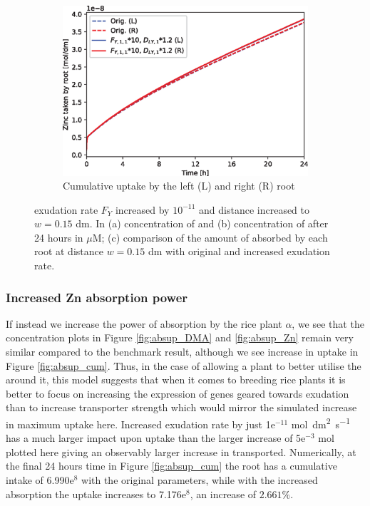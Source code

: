 \documentclass[11pt]{article}
\numberwithin{equation}{section}
\begin{document}
\begin{figure}[h]
\begin{subfigure}[t]{0.31\textwidth}
     \caption{}
     \label{fig:Fwup_Zn}
     \end{subfigure}
    \begin{subfigure}[t]{0.37\textwidth}
    \includegraphics[width=\textwidth]{Figures/testpics/ZnCumulative/IncreasedDistanceandDMAZnCumu.eps}
    \caption{Cumulative  uptake by the left (L) and right (R) root}
     \label{fig:Fwup_cum}
    \end{subfigure}
    \caption{ exudation rate $F_Y$ increased by $10^{-11}$ and distance increased to $w=0.15$ \si{dm}. In (a) concentration of  and (b) concentration of  after 24 hours in $\mu$M; (c) comparison of the amount of  absorbed by each root at distance $w=0.15$ \si{dm} with original and increased exudation rate.}
\end{figure}

 
 \subsubsection{Increased Zn absorption power}
 
If instead we increase the power of  absorption by the rice plant $\alpha$, we see that the concentration plots in Figure \ref{fig:absup_DMA} and \ref{fig:absup_Zn} remain very similar compared to the benchmark result, although we see increase in  uptake in Figure \ref{fig:absup_cum}. Thus, in the case of allowing a plant to better utilise the  around it, this model suggests that when it comes to breeding rice plants it is better to focus on increasing the expression of genes geared towards  exudation than to increase transporter strength which would mirror the simulated increase in maximum  uptake here. Increased  exudation rate by just 1e$^{-11}$ \si{mol.dm^2.s^{-1}}  has a much larger impact upon  uptake than the larger increase of 5e$^{-3}$ \si{mol} plotted here giving an observably larger increase in  transported. Numerically, at the final 24 hours time in Figure \ref{fig:absup_cum} the root has a cumulative intake of 6.990e$^{8}$ with the original parameters, while with the increased  absorption the uptake increases to 7.176e$^{8}$, an increase of $2.661\%$.
\end{document}
